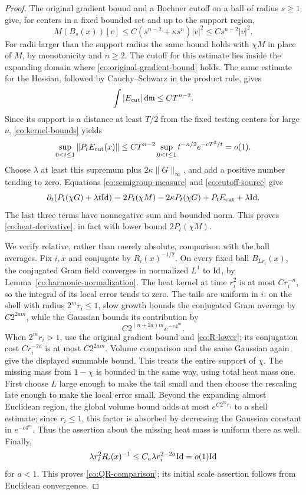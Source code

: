\begin{proof}
The original gradient bound and a Bochner cutoff on a ball of
radius \(s\ge1\) give, for centers in a fixed bounded set and up
to the support region,
\begin{equation}\label{co:raw-mass-growth}
 M(B_s(x))[v]\le C(s^{n-2}+\kappa s^n)|v|^2
 \le Cs^{n-2}|v|^2.
\end{equation}
For radii larger than the support radius the same bound holds
with \(\chi M\) in place of \(M\), by monotonicity and \(n\ge2\).
The cutoff for this estimate lies inside the expanding domain
where \eqref{co:original-gradient-bound} holds.  The same estimate
for the Hessian, followed by Cauchy--Schwarz in the product rule,
gives
\[
 \int|E_{\rm cut}|\,\mathrm d\mathfrak m\le CT^{n-2}.
\]
Since its support is a distance at least \(T/2\) from the fixed
testing centers for large \(\nu\), \eqref{co:kernel-bounds} yields
\begin{equation}\label{co:cutoff-small}
 \sup_{0<t\le1}\|P_t E_{\rm cut}(x)\|
 \le C T^{n-2}\sup_{0<t\le1}t^{-n/2}e^{-cT^2/t}
 =o(1).
\end{equation}
Choose \(\lambda\) at least this supremum plus
\(2\kappa\|G\|_\infty\), and add a positive number tending to
zero.  Equations \eqref{co:semigroup-measure} and
\eqref{co:cutoff-source} give
\[
 \partial_t(P_t(\chi G)+\lambda t\mathrm{Id})
 =2P_t(\chi M)-2\kappa P_t(\chi G)
     +P_tE_{\rm cut}+\lambda\mathrm{Id}.
\]
The last three terms have nonnegative sum and bounded norm.  This
proves \eqref{co:heat-derivative}, in fact with lower bound
\(2P_t(\chi M)\).

We verify relative, rather than merely absolute, comparison with
the ball averages.  Fix \(i,x\) and conjugate by \(R_i(x)^{-1/2}\).
On every fixed ball \(B_{Lr_i}(x)\), the conjugated Gram field
converges in normalized \(L^1\) to \(\mathrm{Id}\), by
Lemma~\ref{co:harmonic-normalization}.  The heat kernel at time
\(r_i^2\) is at most \(Cr_i^{-n}\), so the integral of its local
error tends to zero.  The tails are uniform in \(i\): on the
shell with radius \(2^m r_i\le1\), slow growth bounds the
conjugated Gram average by \(C2^{2am}\), while the Gaussian
bounds its contribution by
\[
 C2^{(n+2a)m}e^{-c4^m}.
\]
When \(2^m r_i>1\), use the original gradient bound and
\eqref{co:R-lower}; its conjugation cost \(Cr_i^{-2a}\) is at
most \(C2^{2am}\).  Volume comparison and the same Gaussian again
give the displayed summable bound.  This treats the entire
support of \(\chi\).  The missing mass from \(1-\chi\) is
bounded in the same way, using total heat mass one.  First choose
\(L\) large enough to make the tail small and then choose the
rescaling late enough to make the local error small.  Beyond the
expanding almost Euclidean region, the global volume bound adds
at most \(e^{C2^m r_i}\) to a shell estimate; since \(r_i\le1\),
this factor is absorbed by decreasing the Gaussian constant in
\(e^{-c4^m}\).  Thus the assertion about the missing heat mass is
uniform there as well.  Finally,
\[
 \lambda r_i^2R_i(x)^{-1}\le C_a\lambda r_i^{2-2a}\mathrm{Id}=o(1)\mathrm{Id}
\]
for \(a<1\).  This proves \eqref{co:QR-comparison}; its initial
scale assertion follows from Euclidean convergence.


\end{proof}
